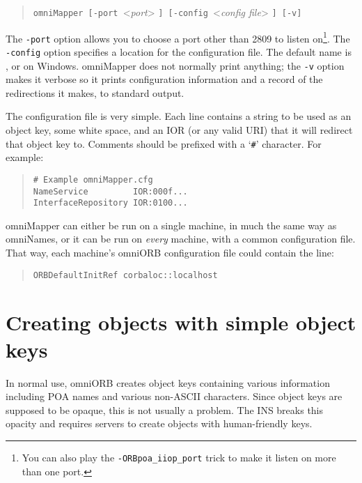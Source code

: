 \documentclass[11pt,twoside,a4paper]{book}
\newcommand{\cmdline}[1]{\texttt{#1}}
\newcommand{\file}{\begingroup \urlstyle{tt}\Url}
\begin{document}
\begin{quote}
\cmdline{omniMapper [-port }<\textit{port}>%
\cmdline{] [-config }<\textit{config file}>%
\cmdline{] [-v]}
\end{quote}

\noindent The \cmdline{-port} option allows you to choose a port other
than 2809 to listen on\footnote{You can also play the
\cmdline{-ORBpoa\_iiop\_port} trick to make it listen on more than one
port.}. The \cmdline{-config} option specifies a location for the
configuration file. The default name is \file{/etc/omniMapper.cfg}, or
\file{C:\omniMapper.cfg}
on Windows. omniMapper does not normally print anything; the
\cmdline{-v} option makes it verbose so it prints configuration
information and a record of the redirections it makes, to standard
output.

The configuration file is very simple. Each line contains a string to
be used as an object key, some white space, and an IOR (or any valid
URI) that it will redirect that object key to. Comments should be
prefixed with a `\texttt{\#}' character. For example:

\begin{quote}
\begin{verbatim}
# Example omniMapper.cfg
NameService         IOR:000f...
InterfaceRepository IOR:0100...
\end{verbatim}
\end{quote}

omniMapper can either be run on a single machine, in much the same way
as omniNames, or it can be run on \emph{every} machine, with a common
configuration file. That way, each machine's omniORB configuration
file could contain the line:

\begin{quote}
\begin{verbatim}
ORBDefaultInitRef corbaloc::localhost
\end{verbatim}
\end{quote}



\section{Creating objects with simple object keys}

In normal use, omniORB creates object keys containing various
information including POA names and various non-ASCII characters.
Since object keys are supposed to be opaque, this is not usually a
problem. The INS breaks this opacity and requires servers to create
objects with human-friendly keys.
\end{document}
